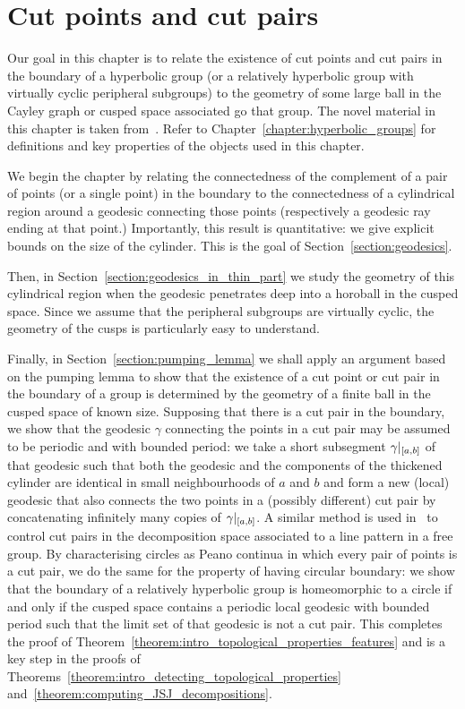 \chapter{Cut points and cut pairs}\label{chapter:detecting_cut_pairs}

Our goal in this chapter is to relate the existence of cut points and cut pairs in the boundary of a hyperbolic group (or a relatively hyperbolic group with virtually cyclic peripheral subgroups) to the geometry of some large ball in the Cayley graph or cusped space associated go that group.
The novel material in this chapter is taken from~\cite[Section 1--2]{barrett18}.
Refer to Chapter~\ref{chapter:hyperbolic_groups} for definitions and key properties of the objects used in this chapter.

We begin the chapter by relating the connectedness of the complement of a pair of points (or a single point) in the boundary to the connectedness of a cylindrical region around a geodesic connecting those points (respectively a geodesic ray ending at that point.)
Importantly, this result is quantitative: we give explicit bounds on the size of the cylinder.
This is the goal of Section~\ref{section:geodesics}.

Then, in Section~\ref{section:geodesics_in_thin_part} we study the geometry of this cylindrical region when the geodesic penetrates deep into a horoball in the cusped space.
Since we assume that the peripheral subgroups are virtually cyclic, the geometry of the cusps is particularly easy to understand.

Finally, in Section~\ref{section:pumping_lemma} we shall apply an argument based on the pumping lemma to show that the existence of a cut point or cut pair in the boundary of a group is determined by the geometry of a finite ball in the cusped space of known size.
Supposing that there is a cut pair in the boundary, we show that the geodesic $\gamma$ connecting the points in a cut pair may be assumed to be periodic and with bounded period: we take a short subsegment $\gamma\vert_{[a, b]}$ of that geodesic such that both the geodesic and the components of the thickened cylinder are identical in small neighbourhoods of $a$ and $b$ and form a new (local) geodesic that also connects the two points in a (possibly different) cut pair by concatenating infinitely many copies of $\gamma\vert_{[a, b]}$. 
A similar method is used in~\cite{cashenmacura11} to control cut pairs in the decomposition space associated to a line pattern in a free group. 
By characterising circles as Peano continua in which every pair of points is a cut pair, we do the same for the property of having circular boundary: we show that the boundary of a relatively hyperbolic group is homeomorphic to a circle if and only if the cusped space contains a periodic local geodesic with bounded period such that the limit set of that geodesic is not a cut pair.
This completes the proof of Theorem~\ref{theorem:intro_topological_properties_features} and is a key step in the proofs of Theorems~\ref{theorem:intro_detecting_topological_properties} and~\ref{theorem:computing_JSJ_decompositions}.

